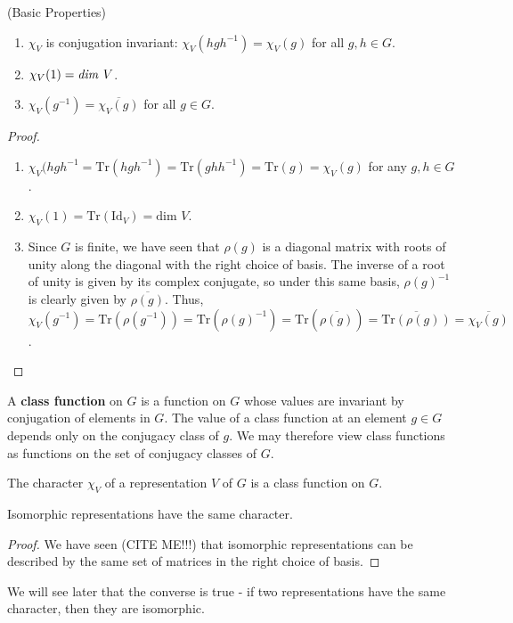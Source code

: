 \begin{prop} (Basic Properties)
\begin{enumerate}
\item $\chi_V$ is conjugation invariant: $\chi_V (h g h^{-1}) = \chi_V (g)$ for all $g , h \in G$.
\item $\chi_V (1) = \text{\emph{dim }} V$.
\item \label{char-of-inverse} $\chi_V (g^{-1}) = \overline{\chi_V (g)}$ for all $g \in G$.
\end{enumerate}
\end{prop}

\begin{proof}
\begin{enumerate}
\item $\chi_V (h g h^{-1} = \text{Tr}(h g h^{-1}) = \text{Tr}(g h h^{-1}) = \text{Tr} (g) = \chi_V(g)$ for any $g,h \in G$.
\item $\chi_V(1) = \text{Tr}(\text{Id} _V) = \text{dim } V$.
\item Since $G$ is finite, we have seen that $\rho(g)$ is a diagonal matrix with roots of unity along the diagonal with the right choice of basis.  The inverse of a root of unity is given by its complex conjugate, so under this same basis, $\rho(g)^{-1}$ is clearly given by $\overline{\rho(g)}$.  Thus, $\chi_V(g^{-1}) = \text{Tr}(\rho(g^{-1})) = \text{Tr}(\rho(g)^{-1}) = \text{Tr}(\overline{\rho(g)}) = \overline{ \text{Tr} (\rho(g))} = \overline {\chi_V(g)}$.
\end{enumerate}
\end{proof}

\begin{defn}
A \textbf{class function} on $G$ is a function on $G$ whose values are invariant by conjugation of elements in $G$.  The value of a class function at an element $g \in G$ depends only on the conjugacy class of $g$.  We may therefore view class functions as functions on the set of conjugacy classes of $G$.
\end{defn}
\begin{note}
The character $\chi_V$ of a representation $V$ of $G$ is a class function on $G$.
\end{note}

\begin{prop}\label{iso-reprns-same-char}
Isomorphic representations have the same character.
\end{prop}
\begin{proof}
We have seen (CITE ME!!!) that isomorphic representations can be described by the same set of matrices in the right choice of basis.
\end{proof}
We will see later that the converse is true - if two representations have the same character, then they are isomorphic.

